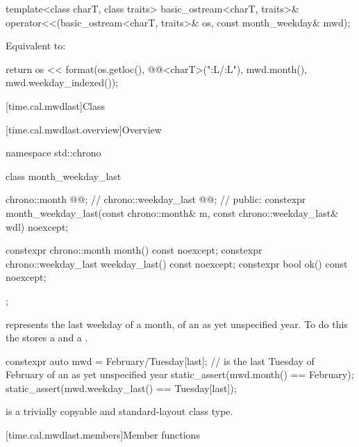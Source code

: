 %
\begin{itemdecl}
template<class charT, class traits>
  basic_ostream<charT, traits>&
    operator<<(basic_ostream<charT, traits>& os, const month_weekday& mwd);
\end{itemdecl}

\begin{itemdescr}
\pnum
\effects
Equivalent to:
\begin{codeblock}
return os << format(os.getloc(), @@<charT>("{:L}/{:L}"),
                    mwd.month(), mwd.weekday_indexed());
\end{codeblock}
\end{itemdescr}

[time.cal.mwdlast]{Class }

[time.cal.mwdlast.overview]{Overview}

\begin{codeblock}
namespace std::chrono {
  class month_weekday_last {
    chrono::month        @@;    // \expos
    chrono::weekday_last @@;  // \expos
  public:
    constexpr month_weekday_last(const chrono::month& m,
                                 const chrono::weekday_last& wdl) noexcept;

    constexpr chrono::month        month()        const noexcept;
    constexpr chrono::weekday_last weekday_last() const noexcept;
    constexpr bool ok() const noexcept;
  };
}
\end{codeblock}

\pnum
{} represents the last weekday of a month,
of an as yet unspecified year.
To do this the  stores a  and a .

\pnum
\begin{example}
\begin{codeblock}
constexpr auto mwd
    = February/Tuesday[last];   //  is the last Tuesday of February of an as yet unspecified year
static_assert(mwd.month() == February);
static_assert(mwd.weekday_last() == Tuesday[last]);
\end{codeblock}
\end{example}

\pnum
{} is a trivially copyable and standard-layout class type.

[time.cal.mwdlast.members]{Member functions}

